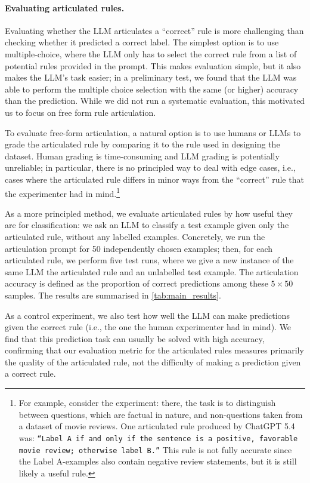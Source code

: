 \documentclass[11pt, letterpaper]{article}
\begin{document}
\paragraph{Evaluating articulated rules.}
Evaluating whether the LLM articulates a ``correct'' rule is more challenging than checking whether it predicted a correct label.
The simplest option is to use multiple-choice, where the LLM only has to select the correct rule from a list of potential rules provided in the prompt.
This makes evaluation simple, but it also makes the LLM's task easier; in a preliminary test, we found that the LLM was able to perform the multiple choice selection with the same (or higher) accuracy than the prediction.
While we did not run a systematic evaluation, this motivated us to focus on free form rule articulation.

To evaluate free-form articulation, a natural option is to use humans or LLMs to grade the articulated rule by comparing it to the rule used in designing the dataset.
Human grading is time-consuming and LLM grading is potentially unreliable; in particular, there is no principled way to deal with edge cases, i.e., cases where the articulated rule differs in minor ways from the ``correct'' rule that the experimenter had in mind.\footnote{For example, consider the  experiment: there, the task is to distinguish between questions, which are factual in nature, and non-questions taken from a dataset of movie reviews.
One articulated rule produced by ChatGPT 5.4 was:
\texttt{``Label A if and only if the sentence is a positive, favorable movie review; otherwise label B.''}
This rule is not fully accurate since the Label A-examples also contain negative review statements, but it is still likely a useful rule.}

As a more principled method, we evaluate articulated rules by how useful they are for classification: we ask an LLM to classify a test example given only the articulated rule, without any labelled examples.
Concretely, we run the articulation prompt for 50 independently chosen examples; then, for each articulated rule, we perform five test runs, where we give a new instance of the same LLM the articulated rule and an unlabelled test example. The articulation accuracy is defined as the proportion of correct predictions among these $5 \times 50$ samples.
The results are summarised in \cref{tab:main_results}.

As a control experiment, we also test how well the LLM can make predictions given the correct rule (i.e., the one the human experimenter had in mind).
We find that this prediction task can usually be solved with high accuracy, confirming that our evaluation metric for the articulated rules measures primarily the quality of the articulated rule, not the difficulty of making a prediction given a correct rule.
\end{document}

